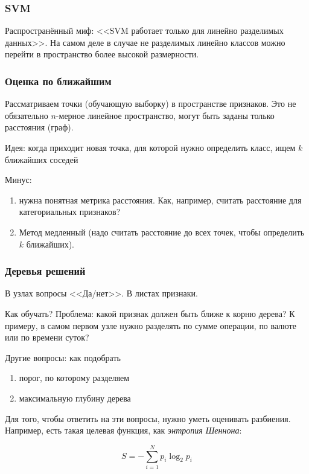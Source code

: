 \documentclass[main.tex]{subfiles}
\begin{document}
\subsubsection{SVM}

Распространённый миф: <<SVM работает только для линейно разделимых данных>>.
На самом деле в случае не разделимых линейно классов можно перейти в пространство более высокой размерности.

\subsubsection{Оценка по ближайшим}

Рассматриваем точки (обучающую выборку) в пространстве признаков.
Это не обязательно $n$-мерное линейное пространство, могут быть заданы только расстояния (граф).

Идея: когда приходит новая точка, для которой нужно определить класс, ищем $k$ ближайших соседей

Минус:

\begin{enumerate}[noitemsep]
	\item нужна понятная метрика расстояния.
	Как, например, считать расстояние для категориальных признаков?
	\item Метод медленный (надо считать расстояние до всех точек, чтобы определить $k$ ближайших).
\end{enumerate}

\subsubsection{Деревья решений}

В узлах вопросы <<Да/нет>>.
В листах признаки.

Как обучать?
Проблема: какой признак должен быть ближе к корню дерева?
К примеру, в самом первом узле нужно разделять по сумме операции, по валюте или по времени суток?

Другие вопросы: как подобрать
\begin{enumerate}[noitemsep]
	\item порог, по которому разделяем
	\item максимальную глубину дерева
\end{enumerate}

Для того, чтобы ответить на эти вопросы, нужно уметь оценивать разбиения.
Например, есть такая целевая функция, как \emph{энтропия Шеннона}:

$$ S = - \sum_{i=1}^{N} p_i \log_2 p_i $$
\end{document}
